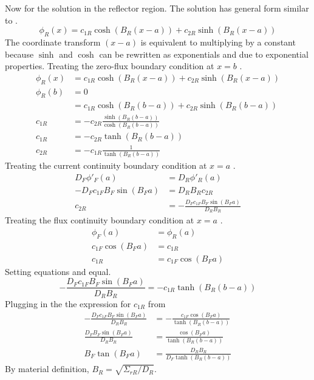   Now for the solution in the reflector region. The solution has general form
  similar to .
  \begin{equation}
    \phi_R(x) = c_{1R} \cosh(B_R (x-a)) + c_{2R} \sinh(B_R (x-a))
  \end{equation}
  The coordinate transform $(x-a)$ is equivalent to multiplying by a constant 
  because $\sinh$ and $\cosh$ can be rewritten as exponentials and due to 
  exponential properties. Treating the zero-flux boundary condition at $x=b$ 
  .
  \begin{align}
    \phi_R(x) &= c_{1R} \cosh(B_R (x-a)) + c_{2R} \sinh(B_R (x-a))\\
    \phi_R(b) &= 0 \\
    &= c_{1R} \cosh(B_R(b-a)) + c_{2R} \sinh(B_R(b-a))\\
    c_{1R} &= -c_{2R} \frac{\sinh(B_R(b-a))}{\cosh(B_R(b-a))}\\
    c_{1R} &= -c_{2R} \tanh(B_R(b-a))\\
    c_{2R} &= -c_{1R} \frac{1}{\tanh(B_R(b-a))} \label{eq:c2rnumber1}
  \end{align}
  Treating the current continuity boundary condition at $x=a$ 
  .
  \begin{align}
    D_F \phi'_F(a) &= D_R \phi'_R(a) \\
    -D_F c_{1F} B_F \sin(B_F a) &= D_R B_R c_{2R} \\
    c_{2R} &= -\frac{D_F c_{1F} B_F \sin(B_F a)}{D_R B_R} \label{eq:c2rnumber2}
  \end{align}
  Treating the flux continuity boundary condition at $x=a$ 
  .
  \begin{align}
    \phi_F(a)&=\phi_R(a) \\
    c_{1F} \cos(B_F a) &= c_{1R} \\
    c_{1R} &= c_{1F} \cos(B_F a) \label{eq:c1r}
  \end{align}
  Setting equations  and  equal.
  \begin{equation}
    - \frac{D_F c_{1F} B_F \sin(B_F a)}{D_R B_R} = -c_{1R} \tanh(B_R(b-a))
  \end{equation}
  Plugging in the the expression for $c_{1R}$ from 
  \begin{align}
    - \frac{D_F c_{1F} B_F \sin(B_F a)}{D_R B_R} &=
      - \frac{c_{1F} \cos(B_F a)}{\tanh(B_R(b-a))}\\
    \frac{D_F B_F \sin(B_F a)}{D_R B_R} &= 
      \frac{\cos(B_F a)}{\tanh(B_R(b-a))} \\
    B_F \tan(B_F a) &= \frac{D_R B_R}{D_F \tanh(B_R(b-a))}
  \end{align}
  By material definition,  ${B_R = \sqrt{\Sigma_{rR}/D_R}}$.
  
